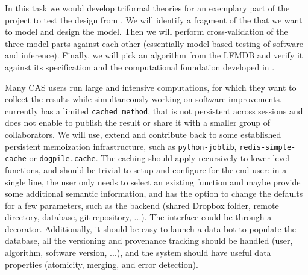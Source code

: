 \begin{workpackage}[id=dksbases,wphases=1-48!.5,
  title=Data/Knowledge/Software-Bases,lead=JU,
  ZHRM=12,JURM=36,USHRM=12,UWRM=25,SARM=10,LLRM=2,PSRM=4]
\begin{tasklist}
\begin{task}[title=\LMFDB Case study (triformal theories),id=data-LMFDB,
  lead=JU,partners={ZH}]
  In this task we would develop triformal theories for an exemplary part of the \LMFDB
  project to test the design from .  We will identify a
  fragment of the \LMFDB that we want to model and design the model. Then we will perform
  cross-validation of the three model parts against each other (essentially model-based
  testing of software and inference). Finally, we will pick an algorithm from the LFMDB
  and verify it against its specification and the computational foundation developed in
  . 
  \end{task}

\begin{task}[title=Memoization and production of new data,id=data-memo,
  lead=SA,partners={US,PS}]
  Many CAS users run large and intensive computations, for which they want to collect the
  results while simultaneously working on software improvements. \Sage currently has a
  limited \lstinline{cached_method}, that is not persistent across sessions and does not
  enable to publish the result or share it with a smaller group of collaborators. We
  will use, extend and contribute back to some established persistent memoization
  infrastructure, such as \texttt{python-joblib}, \texttt{redis-simple-cache} or
  \texttt{dogpile.cache}. The caching should apply recursively to lower level functions,
  and should be trivial to setup and configure for the end user: in a single line, the
  user only needs to select an existing function and maybe provide some additional
  semantic information, and has the option to change the defaults for a few parameters,
  such as the backend (shared Dropbox folder, remote directory, database, git repository,
  ...). The interface could be through a \Python decorator.  Additionally, it should be
  easy to launch a data-bot to populate the database, all the versioning and provenance
  tracking should be handled (user, algorithm, software version, ...), and the system
  should have useful data properties (atomicity, merging, and error detection).
\end{task}
\end{tasklist}


\end{workpackage}
